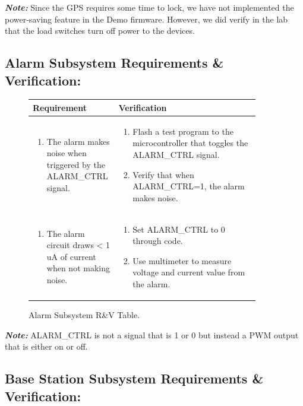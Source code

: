 \documentclass{article}
\begin{document}
\textit{\textbf{Note:}} Since the GPS requires some time to lock, we have not implemented the power-saving feature in the Demo firmware. However, we did verify in the lab that the load switches turn off power to the devices. 




\subsection{Alarm Subsystem Requirements \& Verification:}


\begin{figure}[H]
	\begin{center}
		\begin{tabular}{|p{0.3 \linewidth}|p{0.6 \linewidth}|}
			\hline
			Requirement & Verification  \\
			\hline
			\begin{enumerate}
				\item The alarm makes noise when triggered by the ALARM\_CTRL signal. 
			\end{enumerate}  & \begin{enumerate}
				\item Flash a test program to the microcontroller that toggles the ALARM\_CTRL signal.
				\item Verify that when ALARM\_CTRL=1, the alarm makes noise. 
			\end{enumerate} \\
			\hline
			\begin{enumerate}
				\item The alarm circuit draws < 1 uA of current when not making noise.
			\end{enumerate}  & \begin{enumerate}
				\item Set ALARM\_CTRL to 0 through code.
				\item Use multimeter to measure voltage and current value from the alarm.
			\end{enumerate} \\
			\hline
		\end{tabular}
	\end{center}
	\caption{Alarm Subsystem R\&V Table.}
\end{figure}

\textit{\textbf{Note:}} ALARM\_CTRL is not a signal that is 1 or 0 but instead a PWM output that is either on or off. 


\subsection{Base Station Subsystem Requirements \& Verification:}
\end{document}
